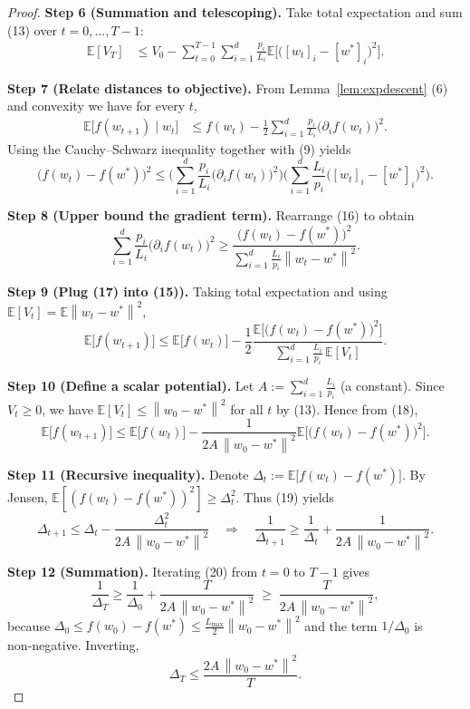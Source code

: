 \documentclass{article}
\newcommand{\E}{\mathbb{E}}
\newcommand{\norm}[1]{\left\|#1\right\|}
\begin{document}
\begin{proof}
\textbf{Step 6 (Summation and telescoping).}  
Take total expectation and sum (13) over $t=0,\dots ,T-1$:
\[
\begin{aligned}
\E[V_T]
&\le V_0-\sum_{t=0}^{T-1}\sum_{i=1}^{d}\frac{p_i}{L_i}
   \E\!\big[\big([w_t]_i-[w^{*}]_i\big)^{2}\big].
\end{aligned}
\tag{14}
\]

\textbf{Step 7 (Relate distances to objective).}  
From Lemma~\ref{lem:expdescent} (6) and convexity we have for every $t$,
\[
\begin{aligned}
\E\!\big[f(w_{t+1})\mid w_t\big]
&\le f(w_t)-\frac{1}{2}\sum_{i=1}^{d}\frac{p_i}{L_i}
   \big(\partial_i f(w_t)\big)^{2}.
\end{aligned}
\tag{15}
\]
Using the Cauchy–Schwarz inequality together with (9) yields
\[
\big(f(w_t)-f(w^{*})\big)^{2}
\le
\Big(\sum_{i=1}^{d}\frac{p_i}{L_i}\big(\partial_i f(w_t)\big)^{2}\Big)
   \Big(\sum_{i=1}^{d}\frac{L_i}{p_i}
          \big([w_t]_i-[w^{*}]_i\big)^{2}\Big).
\tag{16}
\]

\textbf{Step 8 (Upper bound the gradient term).}  
Rearrange (16) to obtain
\[
\sum_{i=1}^{d}\frac{p_i}{L_i}\big(\partial_i f(w_t)\big)^{2}
\ge
\frac{\big(f(w_t)-f(w^{*})\big)^{2}}
     {\sum_{i=1}^{d}\frac{L_i}{p_i}\norm{w_t-w^{*}}^{2}}.
\tag{17}
\]

\textbf{Step 9 (Plug (17) into (15)).}  
Taking total expectation and using $\E[V_t]=\E\norm{w_t-w^{*}}^{2}$,
\[
\E\!\big[f(w_{t+1})\big]
\le \E\!\big[f(w_t)\big]
   -\frac{1}{2}
     \frac{\E\!\big[\big(f(w_t)-f(w^{*})\big)^{2}\big]}
          {\sum_{i=1}^{d}\frac{L_i}{p_i}\,\E[V_t]}.
\tag{18}
\]

\textbf{Step 10 (Define a scalar potential).}  
Let $A:=\sum_{i=1}^{d}\frac{L_i}{p_i}$ (a constant).  Since $V_t\ge 0$, we have $\E[V_t]\le \norm{w_0-w^{*}}^{2}$ for all $t$ by (13).  Hence from (18),
\[
\E\!\big[f(w_{t+1})\big]
\le \E\!\big[f(w_t)\big]
   -\frac{1}{2A\,\norm{w_0-w^{*}}^{2}}
       \E\!\big[\big(f(w_t)-f(w^{*})\big)^{2}\big].
\tag{19}
\]

\textbf{Step 11 (Recursive inequality).}  
Denote $\Delta_t:=\E\!\big[f(w_t)-f(w^{*})\big]$.  By Jensen,
$\E[(f(w_t)-f(w^{*}))^{2}]\ge \Delta_t^{2}$.  Thus (19) yields
\[
\Delta_{t+1}\le \Delta_t-\frac{\Delta_t^{2}}{2A\,\norm{w_0-w^{*}}^{2}}
\quad\Longrightarrow\quad
\frac{1}{\Delta_{t+1}}\ge \frac{1}{\Delta_t}+\frac{1}{2A\,\norm{w_0-w^{*}}^{2}}.
\tag{20}
\]

\textbf{Step 12 (Summation).}  
Iterating (20) from $t=0$ to $T-1$ gives
\[
\frac{1}{\Delta_T}\ge \frac{1}{\Delta_0}
   +\frac{T}{2A\,\norm{w_0-w^{*}}^{2}}
   \;\ge\; \frac{T}{2A\,\norm{w_0-w^{*}}^{2}},
\]
because $\Delta_0\le f(w_0)-f(w^{*})\le \frac{L_{\max}}{2}\norm{w_0-w^{*}}^{2}$ and the term $1/\Delta_0$ is non‑negative.  Inverting,
\[
\Delta_T\le \frac{2A\,\norm{w_0-w^{*}}^{2}}{T}.
\tag{21}
\]


\end{proof}
\end{document}
